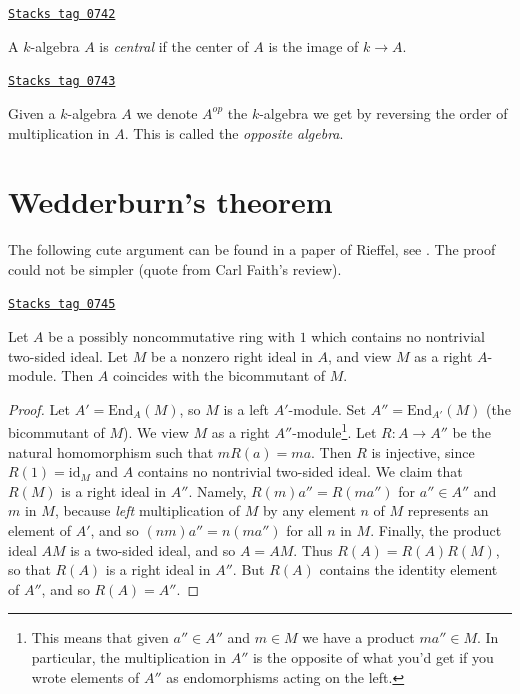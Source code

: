 \begin{definition}[Central]
\label{brauer-definition-central}
\href{https://stacks.math.columbia.edu/tag/0742}{\texttt{Stacks tag 0742}}

A $k$-algebra $A$ is {\it central} if the center of $A$ is the image of
$k \to A$.
\end{definition}

\begin{definition}[Opposite]
\label{brauer-definition-opposite}
\href{https://stacks.math.columbia.edu/tag/0743}{\texttt{Stacks tag 0743}}

Given a $k$-algebra $A$ we denote $A^{op}$ the $k$-algebra we get by
reversing the order of multiplication in $A$. This is called the
{\it opposite algebra}.
\end{definition}

\section{Wedderburn's theorem}
\label{brauer-section-wedderburn}
The following cute argument can be found in a paper of Rieffel, see
\cite{Rieffel}. The proof could not be simpler (quote from
Carl Faith's review).

\begin{lemma}[Rieffel]
\label{brauer-lemma-rieffel}
\href{https://stacks.math.columbia.edu/tag/0745}{\texttt{Stacks tag 0745}}

Let $A$ be a possibly noncommutative ring with $1$ which contains no
nontrivial two-sided ideal. Let $M$ be a nonzero right ideal in $A$,
and view $M$ as a right $A$-module. Then $A$ coincides with the
bicommutant of $M$.
\end{lemma}

\begin{proof}
Let $A' = \text{End}_A(M)$, so $M$ is a left $A'$-module.
Set $A'' = \text{End}_{A'}(M)$ (the bicommutant of $M$).
We view $M$ as a right $A''$-module\footnote{This
means that given $a'' \in A''$ and $m \in M$ we have a product
$m a'' \in M$. In particular, the multiplication in $A''$
is the opposite of what you'd get if you wrote elements of $A''$
as endomorphisms acting on the left.}.
Let $R : A \to A''$ be the natural homomorphism such that
$mR(a) = ma$. Then $R$ is injective, since $R(1) = \text{id}_M$
and $A$ contains no nontrivial two-sided ideal. We claim that $R(M)$
is a right ideal in $A''$. Namely, $R(m)a'' = R(ma'')$ for $a'' \in A''$
and $m$ in $M$, because {\it left} multiplication of $M$ by any element $n$
of $M$ represents an element of $A'$, and so
$(nm)a'' = n(ma'')$ for all $n$ in $M$.
Finally, the product ideal $AM$ is a two-sided ideal, and so
$A = AM$. Thus $R(A) = R(A)R(M)$, so that $R(A)$ is a right ideal in $A''$.
But $R(A)$ contains the identity element of $A''$, and so $R(A) = A''$.
\end{proof}

